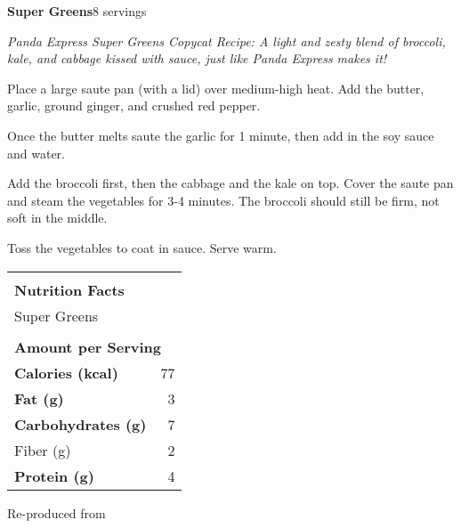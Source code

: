 \documentclass[../recipe-collections/cooking.tex]{subfiles}
\begin{document}
\begin{recipe}{\textbf{Super Greens}}{8 servings}{}

  \freeform{}\textit{Panda Express Super Greens Copycat Recipe: 
  A light and zesty blend of broccoli, kale, and cabbage kissed 
  with sauce, just like Panda Express makes it!}


  Place a large saute pan (with a lid) over medium-high heat. 
  Add the butter, garlic, ground ginger, and crushed red pepper. 


  Once the butter melts saute the garlic for 1 minute, then add 
  in the soy sauce and water.


  Add the broccoli first, then the cabbage and the kale on top. 
  Cover the saute pan and steam the vegetables for 3-4 minutes. 
  The broccoli should still be firm, not soft in the middle. 

  Toss the vegetables to coat in sauce. Serve warm. 

  \bigskip
  \centering
  \begin{tabular}{|lr|}
    \hline
                                        &                                       \\
    \multicolumn{2}{|l|}{\huge{\textbf{\textrm{Nutrition Facts}}}}              \\
    \multicolumn{2}{|l|}{\textrm{Super Greens}}                               \\ 
                                        &                                       \\
    \multicolumn{2}{|l|}{\footnotesize{\textbf{\textrm{Amount per Serving}}}}   \\ \hline
    \textbf{\textrm{Calories (kcal)}}   & \textrm{77}                          \\ \hline
    \textbf{\textrm{Fat (g)}}           & \textrm{3}                           \\ \hline
    \textbf{\textrm{Carbohydrates (g)}} & \textrm{7}                            \\ \hline
    \hspace{2mm} \textrm{Fiber (g)}     & \textrm{2}                            \\ \hline
    \textbf{\textrm{Protein (g)}}       & \textrm{4}                            \\ \hline
  \end{tabular}

  \freeform{}\hrulefill{}

\end{recipe}

Re-produced from  
\autocite{ASpicyPerspective_PandaExpressSuperGreens_2019}
\end{document}
